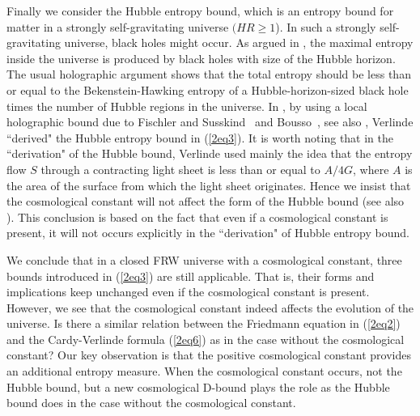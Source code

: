 \documentclass[a4paper,12pt]{article}
\begin{document}
 Finally we consider the Hubble entropy bound, which is an entropy
 bound for matter in a strongly self-gravitating universe $(HR\ge1$). In such
 a strongly self-gravitating universe,  black holes might occur. 
 As argued in \cite{FS,Hubb}, the maximal
 entropy inside the universe is produced by black holes with
 size of the Hubble horizon. The usual holographic argument shows
 that the total entropy should be less than or equal to the
 Bekenstein-Hawking entropy of a Hubble-horizon-sized black hole
 times the number of Hubble regions in the universe. In
 \cite{Verl}, by using a local holographic bound due to
 Fischler and Susskind~\cite{FS} and Bousso~\cite{Bous}, see
 also \cite{Wald}, Verlinde ``derived" the Hubble entropy bound
 in (\ref{2eq3}). It is worth noting that in the ``derivation" of the Hubble 
bound, Verlinde used mainly the idea that the entropy flow $S$ through 
a contracting light sheet is less than or equal to $A/4G$, where $A$ is the 
area of the surface from which the light sheet originates.
Hence we insist that the cosmological constant will not affect the form of 
the Hubble bound (see also \cite{CM}). This conclusion is based on the fact that
even if a cosmological constant is present, it will not 
occurs explicitly in the ``derivation" of Hubble entropy bound.  



We conclude that in a closed FRW universe with a cosmological
constant, three bounds introduced in (\ref{2eq3}) are still 
applicable.  That is, their forms and implications keep 
unchanged even if  the cosmological constant is present. 
However, we see that the cosmological constant indeed affects the
evolution of the universe. Is there a similar relation between the
Friedmann equation in (\ref{2eq2}) and the Cardy-Verlinde formula
(\ref{2eq6}) as in the case without the cosmological constant?  
 Our key observation is that the positive  cosmological constant provides an
additional entropy measure. When the cosmological constant
occurs, not the Hubble bound, but a new cosmological D-bound
plays the role as the Hubble bound does in the case without the
cosmological constant.
\end{document}
